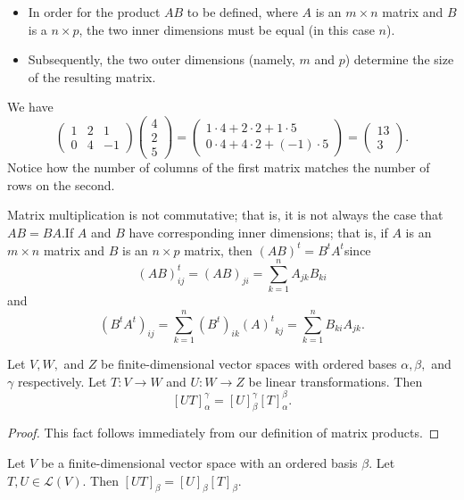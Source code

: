 \begin{itemize}
    \item In order for the product \( AB  \) to be defined, where \( A  \) is an \( m \times n  \) matrix and \( B  \) is a \( n \times  p  \), the two inner dimensions must be equal (in this case \( n  \)).
    \item Subsequently, the two outer dimensions (namely, \( m \) and \( p \)) determine the size of the resulting matrix.
\end{itemize}

\begin{eg}
    We have
    \[  \begin{pmatrix}
        1 & 2 & 1 \\
        0 & 4 & -1
    \end{pmatrix} \begin{pmatrix}
        4 \\
        2 \\
        5 
    \end{pmatrix} = \begin{pmatrix}
        1 \cdot 4 + 2 \cdot 2 + 1 \cdot 5 \\
        0 \cdot 4 + 4 \cdot 2 + (-1) \cdot 5
    \end{pmatrix} = \begin{pmatrix}
        13 \\
        3
    \end{pmatrix}. \]
    Notice how the number of columns of the first matrix matches the number of rows on the second.
\end{eg}

 Matrix multiplication is not commutative; that is, it is not always the case that \( AB =  BA  \).If \( A  \) and \( B  \) have corresponding inner dimensions; that is, if \( A  \) is an \( m \times n  \) matrix and \( B  \) is an \( n \times p  \) matrix, then \( (AB)^{t} = B^{t} A^{t} \)since
 \[  (AB)^{t}_{ij} = (AB)_{ji} = \sum_{ k=1 }^{ n } {A}_{jk } {B}_{ki} \] 
 and 
 \[  {(B^{t}A^{t})}_{ij} = \sum_{ k=1 }^{ n } (B^{t})_{ik} {(A)^{t}}_{kj } = \sum_{ k=1 }^{ n } {B}_{ki} {A}_{jk }.  \]

\begin{theorem}
    Let \( V,W,   \) and \( Z  \) be finite-dimensional vector spaces with ordered bases \( \alpha , \beta ,  \) and \( \gamma \) respectively. Let \( T: V \to W  \) and \( U : W \to Z  \) be linear transformations. Then
    \[  [UT]_{\alpha}^{\gamma} = [U]_{\beta}^{\gamma} [T]_{\alpha}^{\beta}. \]
\end{theorem} 
\begin{proof}
This fact follows immediately from our definition of matrix products.
\end{proof}

\begin{corollary}
    Let \( V  \) be a finite-dimensional vector space with an ordered basis \( \beta  \). Let \( T,U \in \mathcal{L}(V) \). Then \( [UT]_{\beta}^{}  = [U]_{\beta}^{}  [T]_{\beta}^{}  \).
\end{corollary}
 

